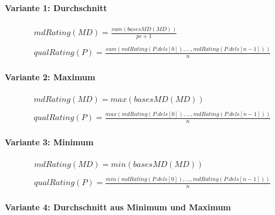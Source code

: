 \documentclass[a4paper,12pt]{article}
\begin{document}
\paragraph{Variante 1: Durchschnitt}

\begin{gather*}
\mathit{mdRating(MD)} = \frac{\mathit{sum(basesMD(MD))}}{\mathit{pc} + 1}
\\\\
\mathit{qualRating(P)} = \frac{ \mathit{sum(mdRating(P.dels[0]),...,mdRating(P.dels[n-1]))}}{n}
\end{gather*}



\paragraph{Variante 2: Maximum}

\begin{gather*}
\mathit{mdRating(MD)} = \mathit{max(basesMD(MD))}
\\\\
\mathit{qualRating(P)} = \frac{\mathit{max(mdRating(P.dels[0]),...,mdRating(P.dels[n-1]))}}{n}
\end{gather*}



\paragraph{Variante 3: Minimum}

\begin{gather*}
\mathit{mdRating(MD)} = \mathit{min(basesMD(MD))}
\\\\
\mathit{qualRating(P)} = \frac{\mathit{min(mdRating(P.dels[0]),...,mdRating(P.dels[n-1]))}}{n}
\end{gather*}

\paragraph{Variante 4: Durchschnitt aus Minimum und Maximum}
\end{document}
